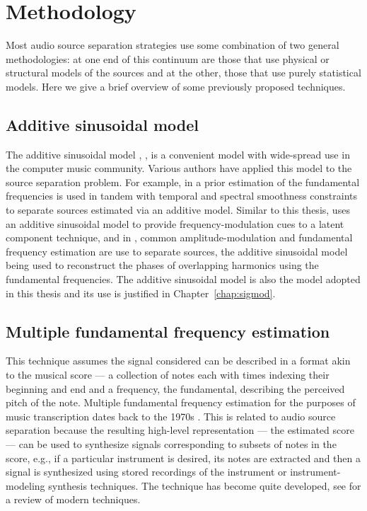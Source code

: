 \chapter{Methodology\label{chap:method}}

Most audio source separation strategies use some combination of two general
methodologies: at one end of this continuum are those that use physical or
structural models of the sources and at the other, those that use purely
statistical models. Here we give a brief overview of some previously proposed
techniques.

\section{Additive sinusoidal model}

The additive sinusoidal model \cite{serra1989system}, \cite{mcaulay1986speech},
is a convenient model with wide-spread use in the computer music community.
Various authors have applied this model to the source separation problem. For
example, in \cite{virtanen2003algorithm} a prior estimation of the fundamental
frequencies is used in tandem with temporal and spectral smoothness constraints
to separate sources estimated via an additive model. Similar to this thesis,
\cite{creager2016musicalsource} uses an additive sinusoidal model to provide
frequency-modulation cues to a latent component technique, and in
\cite{li2009monaural}, common amplitude-modulation and fundamental frequency
estimation are use to separate sources, the additive sinusoidal model being used
to reconstruct the phases of overlapping harmonics using the fundamental
frequencies. The additive sinusoidal model is also the model adopted in this
thesis and its use is justified in Chapter~\ref{chap:sigmod}.

\section{Multiple fundamental frequency estimation}

This technique assumes the signal considered can be described in a format akin
to the musical score --- a collection of notes each with times indexing their
beginning and end and a frequency, the fundamental, describing the perceived
pitch of the note. Multiple fundamental frequency estimation for the purposes of music
transcription dates back to the 1970s \cite[ch.~20]{havelock2008handbook}
\cite{moorer1977transcription}. This
is related to audio source separation because the resulting high-level
representation --- the estimated score --- can be used to synthesize signals
corresponding to subsets of
notes in the score, e.g., if a particular instrument is desired, its notes are
extracted and then a signal is synthesized using stored recordings of the
instrument or instrument-modeling synthesis techniques. The technique has become
quite developed, see \cite[ch.~20]{havelock2008handbook} for a review of
modern techniques.

